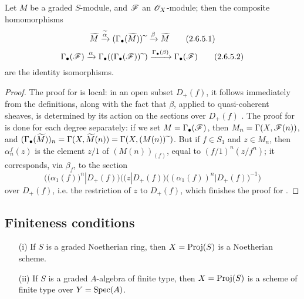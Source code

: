 \begin{proposition}[2.6.5]
\label{II.2.6.5}
Let $M$ be a graded $S$-module, and $\mathscr{F}$ an $\mathscr{O}_X$-module;
then the composite homomorphisms
\[
\label{II.2.6.5.1}
  \widetilde{M}
  \xrightarrow{\widetilde{\alpha}} (\Gamma_\bullet(\widetilde{M})){\,\widetilde{\,}\,}
  \xrightarrow{\beta} \widetilde{M}
\tag{2.6.5.1}
\]
\[
\label{II.2.6.5.2}
  \Gamma_\bullet(\mathscr{F})
  \xrightarrow{\alpha} \Gamma_\bullet((\Gamma_\bullet(\mathscr{F})){\,\widetilde{\,}\,})
  \xrightarrow{\Gamma_\bullet(\beta)} \Gamma_\bullet(\mathscr{F})
\tag{2.6.5.2}
\]
are the identity isomorphisms.
\end{proposition}

\begin{proof}
The proof for  is local:
in an open subset $D_+(f)$, it follows immediately from the definitions, along with the fact that $\beta$, applied to quasi-coherent sheaves, is determined by its action on the sections over $D_+(f)$ .
The proof for  is done for each degree separately:
if we set $M=\Gamma_\bullet(\mathscr{F})$, then $M_n=\Gamma(X,\mathscr{F}(n))$, and $(\Gamma_\bullet(\widetilde{M}))_n=\Gamma(X,\widetilde{M}(n))=\Gamma(X,(M(n)){\,\widetilde{\,}\,})$.
But if $f\in S_1$ and $z\in M_n$, then $\alpha_n^f(z)$ is the element $z/1$ of $(M(n))_{(f)}$, equal to $(f/1)^n(z/f^n)$;
it corresponds, via $\beta_f$, to the section
\[
  \Big(\big(\alpha_1(f)\big)^n|D_+(f)\Big) \Big(\big(z|D_+(f)\big)\big((\alpha_1(f))^n|D_+(f)\big)^{-1}\Big)
\]
over $D_+(f)$, i.e. the restriction of $z$ to $D_+(f)$, which finishes the proof for .
\end{proof}


\subsection{Finiteness conditions}
\label{subsection:II.2.7}

\begin{proposition}[2.7.1]
\label{II.2.7.1}
\begin{enumerate}
  \item[{\rm(i)}] If $S$ is a graded Noetherian ring, then $X=\operatorname{Proj}(S)$ is a Noetherian scheme.
  \item[{\rm(ii)}] If $S$ is a graded $A$-algebra of finite type, then $X=\operatorname{Proj}(S)$ is a scheme of finite type over $Y=\operatorname{Spec}(A)$.
\end{enumerate}
\end{proposition}

